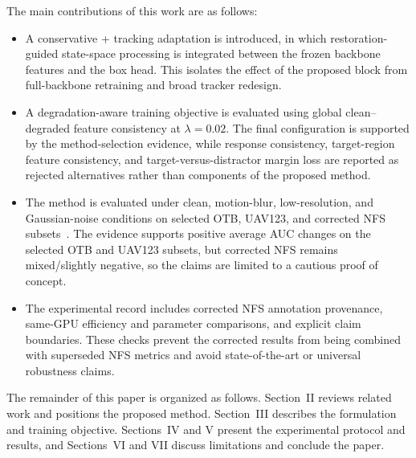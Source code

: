 The main contributions of this work are as follows:
\begin{itemize}
    \item A conservative \baseline{}+\method{} tracking adaptation is introduced, in which restoration-guided state-space processing is integrated between the frozen backbone features and the box head. This isolates the effect of the proposed block from full-backbone retraining and broad tracker redesign.
    \item A degradation-aware training objective is evaluated using global clean--degraded feature consistency at $\lambda=0.02$. The final configuration is supported by the method-selection evidence, while response consistency, target-region feature consistency, and target-versus-distractor margin loss are reported as rejected alternatives rather than components of the proposed method.
    \item The method is evaluated under clean, motion-blur, low-resolution, and Gaussian-noise conditions on selected OTB, UAV123, and corrected NFS subsets~\cite{wu2013otb,mueller2016uav123,galoogahi2017nfs}. The evidence supports positive average AUC changes on the selected OTB and UAV123 subsets, but corrected NFS remains mixed/slightly negative, so the claims are limited to a cautious proof of concept.
    \item The experimental record includes corrected NFS annotation provenance, same-GPU efficiency and parameter comparisons, and explicit claim boundaries. These checks prevent the corrected results from being combined with superseded NFS metrics and avoid state-of-the-art or universal robustness claims.
\end{itemize}
The remainder of this paper is organized as follows. Section~II reviews related work and positions the proposed method. Section~III describes the \method{} formulation and training objective. Sections~IV and V present the experimental protocol and results, and Sections~VI and VII discuss limitations and conclude the paper.
